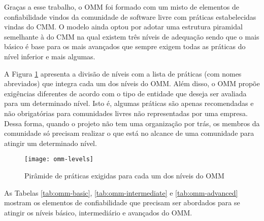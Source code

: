 Graças a esse trabalho, o OMM foi formado com um misto de elementos de
confiabilidade vindos da comunidade de software livre com práticas
estabelecidas vindas do CMM. O modelo ainda optou por adotar uma
estrutura piramidal semelhante à do CMM na qual existem três níveis de
adequação sendo que o mais básico é base para os mais avançados que
sempre exigem todas as práticas do nível inferior e mais algumas.

A Figura \ref{fig:piramide-omm} apresenta a divisão de níveis com a
lista de práticas (com nomes abreviados) que integra cada um dos
níveis do OMM. Além disso, o OMM propõe exigências diferentes de
acordo com o tipo de entidade que deseja ser avaliada para um
determinado nível. Isto é, algumas práticas são apenas recomendadas e
não obrigatórias para comunidades livres não representadas por uma
empresa. Dessa forma, quando o projeto não tem uma organização por
trás, os membros da comunidade só precisam realizar o que está no
alcance de uma comunidade para atingir um determinado nível.

\begin{figure}
  \centering
  \texttt{[image: omm-levels]}
  \caption{Pirâmide de práticas exigidas para cada um dos níveis do
    OMM}
  \label{fig:piramide-omm}
\end{figure}

As Tabelas \ref{tab:omm-basic}, \ref{tab:omm-intermediate} e
\ref{tab:omm-advanced} mostram os elementos de confiabilidade que
precisam ser abordados para se atingir os níveis básico, intermediário
e avançados do OMM.

